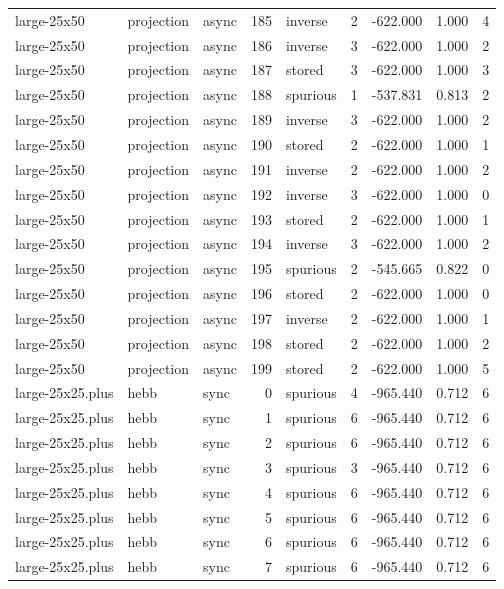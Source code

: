 \begin{tabular}{lllrlrrrr}
large-25x50 & projection & async & 185 & inverse & 2 & -622.000 & 1.000 & 4 \\
large-25x50 & projection & async & 186 & inverse & 3 & -622.000 & 1.000 & 2 \\
large-25x50 & projection & async & 187 & stored & 3 & -622.000 & 1.000 & 3 \\
large-25x50 & projection & async & 188 & spurious & 1 & -537.831 & 0.813 & 2 \\
large-25x50 & projection & async & 189 & inverse & 3 & -622.000 & 1.000 & 2 \\
large-25x50 & projection & async & 190 & stored & 2 & -622.000 & 1.000 & 1 \\
large-25x50 & projection & async & 191 & inverse & 2 & -622.000 & 1.000 & 2 \\
large-25x50 & projection & async & 192 & inverse & 3 & -622.000 & 1.000 & 0 \\
large-25x50 & projection & async & 193 & stored & 2 & -622.000 & 1.000 & 1 \\
large-25x50 & projection & async & 194 & inverse & 3 & -622.000 & 1.000 & 2 \\
large-25x50 & projection & async & 195 & spurious & 2 & -545.665 & 0.822 & 0 \\
large-25x50 & projection & async & 196 & stored & 2 & -622.000 & 1.000 & 0 \\
large-25x50 & projection & async & 197 & inverse & 2 & -622.000 & 1.000 & 1 \\
large-25x50 & projection & async & 198 & stored & 2 & -622.000 & 1.000 & 2 \\
large-25x50 & projection & async & 199 & stored & 2 & -622.000 & 1.000 & 5 \\
large-25x25.plus & hebb & sync & 0 & spurious & 4 & -965.440 & 0.712 & 6 \\
large-25x25.plus & hebb & sync & 1 & spurious & 6 & -965.440 & 0.712 & 6 \\
large-25x25.plus & hebb & sync & 2 & spurious & 6 & -965.440 & 0.712 & 6 \\
large-25x25.plus & hebb & sync & 3 & spurious & 3 & -965.440 & 0.712 & 6 \\
large-25x25.plus & hebb & sync & 4 & spurious & 6 & -965.440 & 0.712 & 6 \\
large-25x25.plus & hebb & sync & 5 & spurious & 6 & -965.440 & 0.712 & 6 \\
large-25x25.plus & hebb & sync & 6 & spurious & 6 & -965.440 & 0.712 & 6 \\
large-25x25.plus & hebb & sync & 7 & spurious & 6 & -965.440 & 0.712 & 6 \\

\end{tabular}
